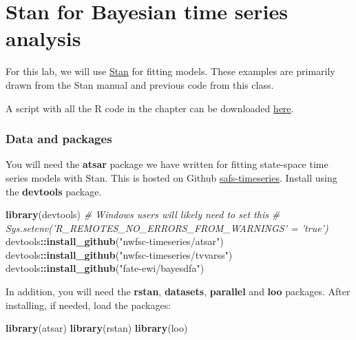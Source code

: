 \documentclass[
]{article}
\author{}
\date{\vspace{-2.5em}}
\newenvironment{Shaded}{\begin{snugshade}}{\end{snugshade}}
\newcommand{\CommentTok}[1]{\textcolor[rgb]{0.56,0.35,0.01}{\textit{#1}}}
\newcommand{\KeywordTok}[1]{\textcolor[rgb]{0.13,0.29,0.53}{\textbf{#1}}}
\newcommand{\NormalTok}[1]{#1}
\newcommand{\OperatorTok}[1]{\textcolor[rgb]{0.81,0.36,0.00}{\textbf{#1}}}
\newcommand{\StringTok}[1]{\textcolor[rgb]{0.31,0.60,0.02}{#1}}
\begin{document}
\hypertarget{chap-stan}{%
\section{Stan for Bayesian time series analysis}\label{chap-stan}}


For this lab, we will use \href{http://mc-stan.org/documentation/}{Stan}
for fitting models. These examples are primarily drawn from the Stan
manual and previous code from this class.

A script with all the R code in the chapter can be downloaded
\href{./Rcode/fitting-models-with-stan.R}{here}.

\hypertarget{data-and-packages}{%
\subsubsection*{Data and packages}\label{data-and-packages}}

You will need the \textbf{atsar} package we have written for fitting
state-space time series models with Stan. This is hosted on Github
\href{https://github.com/nwfsc-timeseries/atsar}{safs-timeseries}.
Install using the \textbf{devtools} package.

\begin{Shaded}
\begin{Highlighting}[]
\KeywordTok{library}\NormalTok{(devtools)}
\CommentTok{# Windows users will likely need to set this}
\CommentTok{# Sys.setenv('R_REMOTES_NO_ERRORS_FROM_WARNINGS' = 'true')}
\NormalTok{devtools}\OperatorTok{::}\KeywordTok{install_github}\NormalTok{(}\StringTok{"nwfsc-timeseries/atsar"}\NormalTok{)}
\NormalTok{devtools}\OperatorTok{::}\KeywordTok{install_github}\NormalTok{(}\StringTok{"nwfsc-timeseries/tvvarss"}\NormalTok{)}
\NormalTok{devtools}\OperatorTok{::}\KeywordTok{install_github}\NormalTok{(}\StringTok{"fate-ewi/bayesdfa"}\NormalTok{)}
\end{Highlighting}
\end{Shaded}

In addition, you will need the \textbf{rstan}, \textbf{datasets},
\textbf{parallel} and \textbf{loo} packages. After installing, if
needed, load the packages:

\begin{Shaded}
\begin{Highlighting}[]
\KeywordTok{library}\NormalTok{(atsar)}
\KeywordTok{library}\NormalTok{(rstan)}
\KeywordTok{library}\NormalTok{(loo)}
\end{Highlighting}
\end{Shaded}
\end{document}
